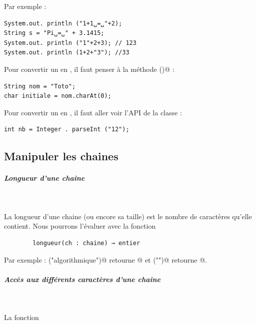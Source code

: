 \documentclass[11pt,a4paper]{article}
\begin{document}
            \par
        Par exemple :
            \par
        \begin{verbatim}
System.out. println ("1+1␣=␣"+2);
String s = "Pi␣=␣" + 3.1415;
System.out. println ("1"+2+3); // 123
System.out. println (1+2+"3"); //33
      \end{verbatim}
		    Pour convertir un \verb@String@ en \verb@char@ , 
		    il faut penser \`a la m\'ethode \verb@charAt()@ :
      
            \par
        \begin{verbatim}
String nom = "Toto";
char initiale = nom.charAt(0);
      \end{verbatim}
		    Pour convertir un \verb@String@ en \verb@int@ , 
		    il faut aller voir l'API de la classe \verb@Integer@ :
      
            \par
        \begin{verbatim}
int nb = Integer . parseInt ("12");
      \end{verbatim}\subsection{Manipuler les chaines}
			
		\subparagraph{Longueur d'une chaine} 
		
					\textcolor{white}{.} \par
				
        La longueur d'une chaine (ou encore sa taille) est le nombre de caract\`eres qu'elle contient.
        Nous pourrons l'\'evaluer avec la fonction
      
            \par
        \begin{verbatim}
        longueur(ch : chaine) → entier
      \end{verbatim}
        Par exemple : \verb@longueur("algorithmique")@ 
        retourne @ et 
        \verb@longueur("")@ retourne @.
      
            \par
        
			
		\subparagraph{Acc\`es aux diff\'erents caract\`eres d'une chaine} 
		
					\textcolor{white}{.} \par
				
        La fonction
       
\end{document}
